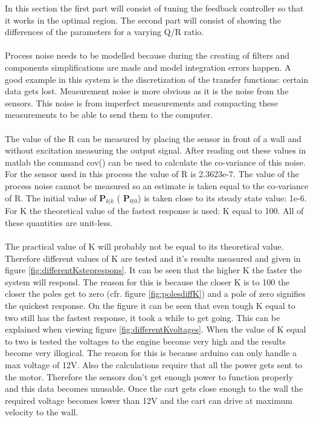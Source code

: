 In this section the first part will consist of tuning the feedback controller so that it works in the optimal region. The second part will consist of showing the differences of the parameters for a varying Q/R ratio.\\
\\
Process noise needs to be modelled because during the creating of filters and components simplifications are made and model integration errors happen. A good example in this system is the discretization of the transfer functions: certain data gets lost. Measurement noise is more obvious as it is the noise from the sensors. This noise is from imperfect measurements and compacting these measurements to be able to send them to the computer.\\
\\
The value of the R can be measured by placing the sensor in front of a wall and without excitation measuring the output signal. After reading out these values in matlab the command cov() can be used to calculate the co-variance of this noise. For the sensor used in this process the value of R is 2.3623e-7. The value of the process noise cannot be measured so an estimate is taken equal to the co-variance of R. The initial value of $\textbf{P}_{k|k}$ ( $\textbf{P}_{0|0}$) is taken close to its steady state value: 1e-6. For K the theoretical value of the fastest response is used: K equal to 100. All of these quantities are unit-less.\\
\\
The practical value of K will probably not be equal to its theoretical value. Therefore different values of K are tested and it's results measured and given in figure \ref{fig:differentKsteprespons}. It can be seen that the higher K the faster the system will respond. The reason for this is because the closer K is to 100 the closer the poles get to zero (cfr. figure \ref{fig:polesdiffK}) and a pole of zero signifies the quickest response. On the figure it can be seen that even tough K equal to two still has the fastest response, it took a while to get going. This can be explained when viewing figure \ref{fig:differentKvoltages}. When the value of K equal to two is tested the voltages to the engine become very high and the results become very illogical. The reason for this is because arduino can only handle a max voltage of 12V. Also the calculations require that all the power gets sent to the motor. Therefore the sensors don't get enough power to function properly and this data becomes unusable. Once the cart gets close enough to the wall the required voltage becomes lower than 12V and the cart can drive at maximum velocity to the wall.\\
